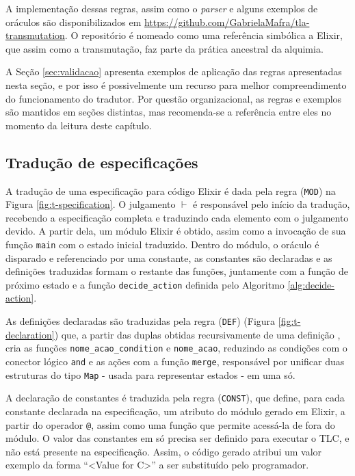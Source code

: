 A implementação dessas regras, assim como o \textit{parser} e alguns exemplos de
oráculos são disponibilizados em
\url{https://github.com/GabrielaMafra/tla-transmutation}. O repositório é
nomeado como uma referência simbólica a Elixir, que assim como a transmutação,
faz parte da prática ancestral da alquimia.

A Seção \ref{sec:validacao} apresenta exemplos de aplicação das regras
apresentadas nesta seção, e por isso é possivelmente um recurso para melhor
compreendimento do funcionamento do tradutor. Por questão organizacional, as
regras e exemplos são mantidos em seções distintas, mas recomenda-se a
referência entre eles no momento da leitura deste capítulo.

\subsection{Tradução de especificações}



A tradução de uma especificação para código Elixir é dada pela regra
(\texttt{MOD}) na Figura \ref{fig:t-specification}. O julgamento $\vdash$ é responsável pelo início da tradução, recebendo a
especificação completa e traduzindo cada elemento com o julgamento devido.
A partir dela, um módulo Elixir é obtido, assim como a invocação de sua
função \texttt{main} com o estado inicial traduzido. Dentro do módulo, o oráculo
é disparado e referenciado por uma constante, as constantes são declaradas e as
definições traduzidas formam o restante das funções, juntamente com a função de
próximo estado e a função \texttt{decide\_action} definida pelo Algoritmo \ref{alg:decide-action}.

As definições declaradas são traduzidas pela regra (\texttt{DEF}) (Figura
\ref{fig:t-declaration}) que, a partir das duplas
obtidas recursivamente de uma definição \FANCYAA, cria as funções \texttt{nome\_acao\_condition} 
e \texttt{nome\_acao}, reduzindo as condições com o conector lógico \texttt{and}
e as ações com a função \texttt{merge}, responsável por unificar duas
estruturas do tipo \texttt{Map} - usada para representar estados - em uma só.

A declaração de constantes é traduzida pela regra (\texttt{CONST}), que define,
para cada constante declarada na especificação, um atributo do módulo gerado em
Elixir, a partir do operador \texttt{@}, assim como uma função que permite acessá-la de
fora do módulo. O valor das constantes em \TLA só precisa ser definido para
executar o TLC, e não está presente na especificação. Assim, o código gerado
atribui um valor exemplo da forma ``<Value for C>'' a ser substituído pelo programador.


